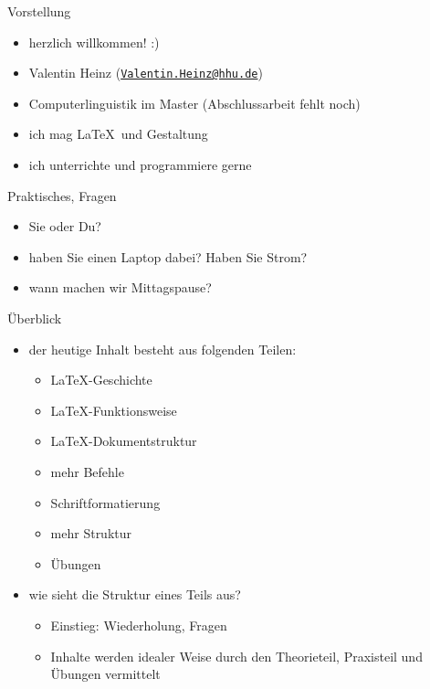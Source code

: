 \begin{frame}{Vorstellung}

\begin{itemize}
\itemsep1pt\parskip0pt
\item
  herzlich willkommen! :)
\item
  Valentin Heinz
  (\href{mailto:Valentin.Heinz@hhu.de}{\nolinkurl{Valentin.Heinz@hhu.de}})
\item
  Computerlinguistik im Master (Abschlussarbeit fehlt noch)
\item
  ich mag \LaTeX \ und Gestaltung
\item
  ich unterrichte und programmiere gerne
\end{itemize}

\end{frame}

\begin{frame}{Praktisches, Fragen}

\begin{itemize}
\itemsep1pt\parskip0pt
\item
  Sie oder Du?
\item
  haben Sie einen Laptop dabei? Haben Sie Strom?
\item
  wann machen wir Mittagspause?
\end{itemize}

\end{frame}

\begin{frame}{Überblick}

\begin{itemize}
\itemsep1pt\parskip0pt
\item
  der heutige Inhalt besteht aus folgenden Teilen:

  \begin{itemize}
  \itemsep1pt\parskip0pt
  \item \LaTeX-Geschichte
  \item \LaTeX-Funktionsweise
  \item \LaTeX-Dokumentstruktur
  \item mehr Befehle
  \item Schriftformatierung
  \item mehr Struktur
  \item Übungen
  \end{itemize}
\item
  wie sieht die Struktur eines Teils aus?

  \begin{itemize}
  \itemsep1pt\parskip0pt
  \item
    Einstieg: Wiederholung, Fragen
  \item
    Inhalte werden idealer Weise durch den Theorieteil, Praxisteil und Übungen vermittelt
  \end{itemize}
\end{itemize}

\end{frame}

